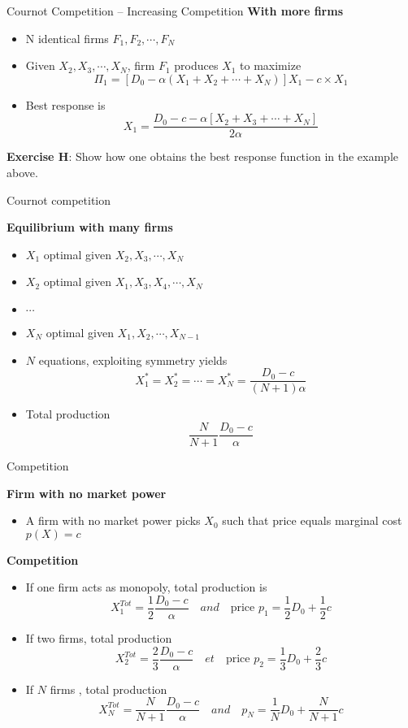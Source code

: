 \documentclass[handout]{beamer}
\newenvironment{iPar}[1]{\textbf{#1} \begin{itemize}}{\end{itemize}}
\newcommand{\mdp}{\medskip \pause}
\begin{document}
\begin{frame}{Cournot Competition -- Increasing Competition}
\begin{iPar}{With more firms}
\item N identical firms $F_1,F_2,\cdots,F_N$
\item Given $X_2, X_3, \cdots, X_N$, firm $F_1$ produces $X_1$ to maximize $$\Pi_1 = [D_0 - \alpha(X_1 + X_2 + \cdots + X_N)]X_1 - c\times X_1$$
\item Best response is $$X_1 = \frac{D_0 - c - \alpha[X_2 + X_3 + \cdots + X_N]}{ 2 \alpha}$$
\end{iPar}

\textbf{Exercise H}: Show how one obtains the best response function in the example above. 

\end{frame}

\begin{frame}{Cournot competition}

\begin{iPar}{Equilibrium with many firms}
\item $X_1$ optimal given $X_2, X_3, \cdots, X_N$
\item $X_2$ optimal given $X_1,X_3,X_4, \cdots, X_N$
\item $\cdots$
\item $X_N$ optimal given $X_1,X_2, \cdots, X_{N-1}$
\item $N$ equations, exploiting symmetry yields $$X_1^* = X_2^* = \cdots = X_N^* = \frac{D_0 - c}{(N+1) \alpha}$$ \item Total production $$\frac{N}{N+1} \frac{D_0 -c}{\alpha}$$
\end{iPar}

\end{frame}

\begin{frame}{Competition}


\begin{iPar}{Firm with no market power}
\item A firm with no market power picks $X_0$  such that price equals marginal cost $ p(X) = c$
\end{iPar}\mdp

\begin{iPar}{Competition}
\item If one firm acts as monopoly, total production is $$X^{Tot}_1 = \frac{1}{2}\frac{D_0-c}{\alpha} \quad  and \quad \textrm{price } p_1 = \frac{1}{2} D_0  + \frac{1}{2} c$$
\item If two firms, total production $$X^{Tot}_2 = \frac{2}{3}\frac{D_0-c}{\alpha} \quad  et \quad \textrm{price } p_2  = \frac{1}{3}D_0 +\frac{2}{3}c$$
\item If $N$ firms , total production $$X^{Tot}_N = \frac{N}{N+1}\frac{D_0-c}{\alpha} \quad  and \quad  p_N = \frac{1}{N}D_0 +\frac{N}{N+1}c$$

\end{iPar}
\end{frame}
\end{document}
